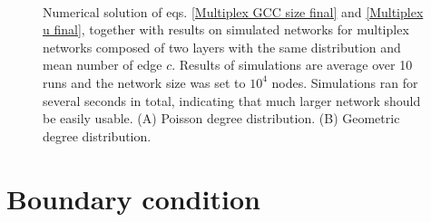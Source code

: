 \documentclass[
11pt, %
english, %
singlespacing, %
liststotoc, %
headsepline, %
]{MastersDoctoralThesis} %
\begin{document}
{
\begin{figure}
	\\
	\caption{Numerical solution of eqs. \eqref{Multiplex GCC size final} and \eqref{Multiplex u final}, together with results on simulated networks for multiplex networks composed of two layers with the same distribution and mean number of edge $c$. Results of simulations are average over 10 runs and the network size was set to $10^4$ nodes. Simulations ran for several seconds in total, indicating that much larger network should be easily usable. (A) Poisson degree distribution. (B) Geometric degree distribution.}
\end{figure}
}

\newpage
\section{Boundary condition}
\end{document}
